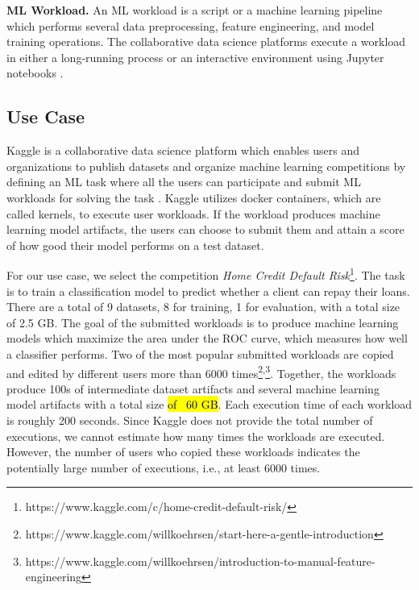\textbf{ML Workload.}
An ML workload is a script or a machine learning pipeline which performs several data preprocessing, feature engineering, and model training operations. 
The collaborative data science platforms execute a workload in either a long-running process or an interactive environment using Jupyter notebooks \cite{Kluyver:2016aa}.

\subsection{Use Case}\label{subsec-motivational-example}
Kaggle is a collaborative data science platform which enables users and organizations to publish datasets and organize machine learning competitions by defining an ML task where all the users can participate and submit ML workloads for solving the task \cite{kagglewebsite}.
Kaggle utilizes docker containers, which are called kernels, to execute user workloads.
If the workload produces machine learning model artifacts, the users can choose to submit them and attain a score of how good their model performs on a test dataset.

For our use case, we select the competition \textit{Home Credit Default Risk}\footnote{https://www.kaggle.com/c/home-credit-default-risk/}.
The task is to train a classification model to predict whether a client can repay their loans.
There are a total of 9 datasets, 8 for training, 1 for evaluation, with a total size of 2.5 GB.
The goal of the submitted workloads is to produce machine learning models which maximize the area under the ROC curve, which measures how well a classifier performs.
Two of the most popular submitted workloads are copied and edited by different users more than 6000 times\footnote{https://www.kaggle.com/willkoehrsen/start-here-a-gentle-introduction}\textsuperscript{,}\footnote{https://www.kaggle.com/willkoehrsen/introduction-to-manual-feature-engineering}.
Together, the workloads produce 100s of intermediate dataset artifacts and several machine learning model artifacts with a total size \hl{of ~60 GB}.
Each execution time of each workload is roughly 200 seconds.
Since Kaggle does not provide the total number of executions, we cannot estimate how many times the workloads are executed.
However, the number of users who copied these workloads indicates the potentially large number of executions, i.e., at least 6000 times.

